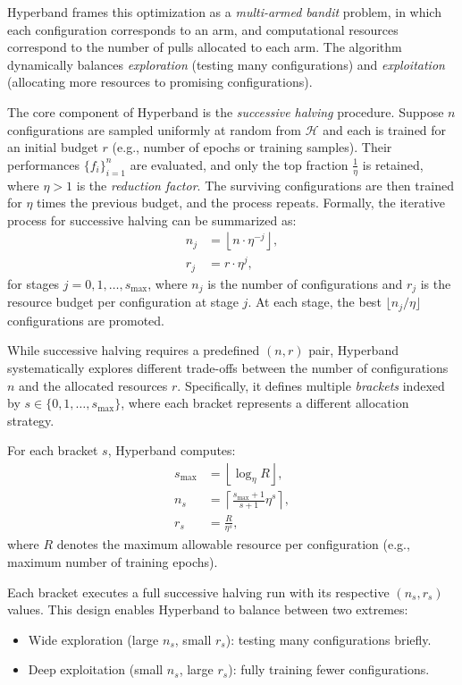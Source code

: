 Hyperband frames this optimization as a \emph{multi-armed bandit} problem, in which each configuration corresponds to an arm, and computational resources correspond to the number of pulls allocated to each arm. The algorithm dynamically balances \textit{exploration} (testing many configurations) and \textit{exploitation} (allocating more resources to promising configurations).

The core component of Hyperband is the \textit{successive halving} procedure. Suppose $n$ configurations are sampled uniformly at random from $\mathcal{H}$ and each is trained for an initial budget $r$ (e.g., number of epochs or training samples). Their performances $\{f_i\}_{i=1}^{n}$ are evaluated, and only the top fraction $\frac{1}{\eta}$ is retained, where $\eta > 1$ is the \textit{reduction factor}. The surviving configurations are then trained for $\eta$ times the previous budget, and the process repeats. Formally, the iterative process for successive halving can be summarized as:
\begin{align}
	n_j & = \left\lfloor n \cdot \eta^{-j} \right\rfloor, \\
	r_j & = r \cdot \eta^{j},
	\label{eq:successive_halving}
\end{align}
for stages $j = 0, 1, \ldots, s_{\max}$, where $n_j$ is the number of configurations and $r_j$ is the resource budget per configuration at stage $j$. At each stage, the best $\lfloor n_j / \eta \rfloor$ configurations are promoted.

While successive halving requires a predefined $(n, r)$ pair, Hyperband systematically explores different trade-offs between the number of configurations $n$ and the allocated resources $r$. Specifically, it defines multiple \textit{brackets} indexed by $s \in \{0, 1, \ldots, s_{\max}\}$, where each bracket represents a different allocation strategy.

For each bracket $s$, Hyperband computes:
\begin{align}
	s_{\max} & = \left\lfloor \log_{\eta} R \right\rfloor,                   \\
	n_s      & = \left\lceil \frac{s_{\max} + 1}{s + 1} \eta^s \right\rceil, \\
	r_s      & = \frac{R}{\eta^s},
	\label{eq:hyperband_parameters}
\end{align}
where $R$ denotes the maximum allowable resource per configuration (e.g., maximum number of training epochs).

Each bracket executes a full successive halving run with its respective $(n_s, r_s)$ values. This design enables Hyperband to balance between two extremes:
\begin{itemize}
	\item Wide exploration (large $n_s$, small $r_s$): testing many configurations briefly.
	\item Deep exploitation (small $n_s$, large $r_s$): fully training fewer configurations.
\end{itemize}

